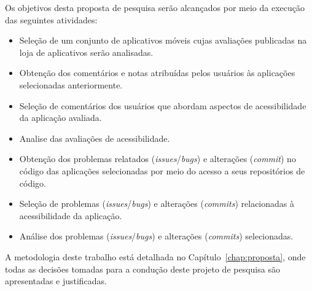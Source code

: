 
Os objetivos desta proposta de pesquisa serão alcançados por meio da execução das seguintes atividades: 
\begin{itemize}
 \item Seleção de um conjunto de aplicativos móveis cujas avaliações publicadas na loja de aplicativos serão analisadas.
 \item Obtenção dos comentários e notas atribuídas pelos usuários às aplicações selecionadas anteriormente.
 \item Seleção de comentários dos usuários que abordam aspectos de acessibilidade da aplicação avaliada. 
 \item Analise das avaliações de acessibilidade.
 \item Obtenção dos problemas relatados (\textit{issues}/\textit{bugs}) e alterações (\textit{commit}) no código das aplicações selecionadas por meio do acesso a seus repositórios de código.
 \item Seleção de problemas (\textit{issues}/\textit{bugs}) e alterações (\textit{commits}) relacionadas à acessibilidade da aplicação.
 \item Análise dos problemas (\textit{issues}/\textit{bugs}) e alterações (\textit{commits}) selecionadas.
\end{itemize}

A metodologia deste trabalho está detalhada no Capítulo~\ref{chap:proposta}, onde todas as decisões tomadas para a condução deste projeto de pesquisa são apresentadas e justificadas. 



